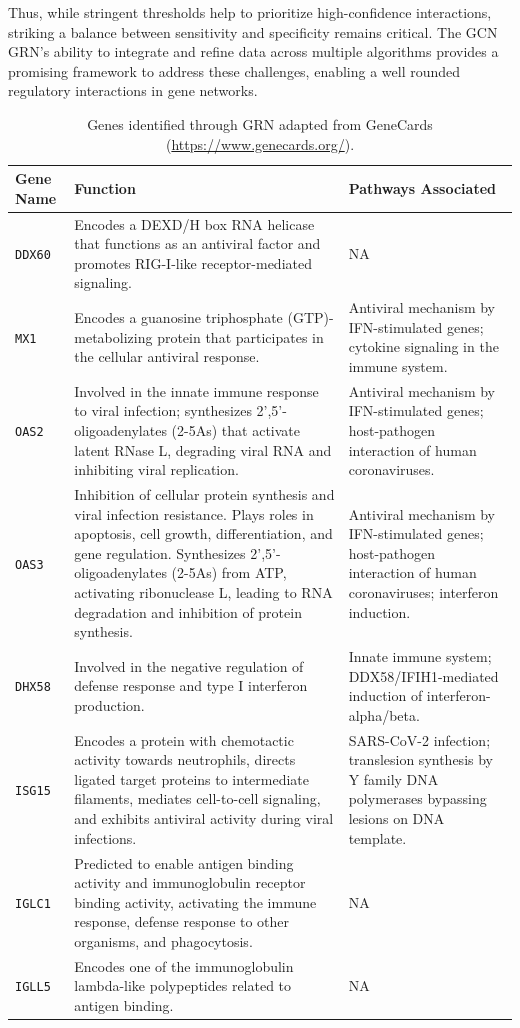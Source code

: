 \documentclass{article}
\begin{document}
Thus, while stringent thresholds help to prioritize high-confidence interactions, striking a balance between sensitivity and specificity remains critical. The GCN GRN’s ability to integrate and refine data across multiple algorithms provides a promising framework to address these challenges, enabling a well rounded regulatory interactions in gene networks.

\begin{table}[h!]
\centering
\caption{Genes identified through GRN adapted from GeneCards (\url{https://www.genecards.org/}).}
\begin{tabular}{|l|p{6cm}|p{6cm}|}
\hline
\textbf{Gene Name} & \textbf{Function} & \textbf{Pathways Associated} \\ \hline
\texttt{DDX60} & Encodes a DEXD/H box RNA helicase that functions as an antiviral factor and promotes RIG-I-like receptor-mediated signaling. & NA \\ \hline
\texttt{MX1} & Encodes a guanosine triphosphate (GTP)-metabolizing protein that participates in the cellular antiviral response. & Antiviral mechanism by IFN-stimulated genes; cytokine signaling in the immune system. \\ \hline
\texttt{OAS2} & Involved in the innate immune response to viral infection; synthesizes 2',5'-oligoadenylates (2-5As) that activate latent RNase L, degrading viral RNA and inhibiting viral replication. & Antiviral mechanism by IFN-stimulated genes; host-pathogen interaction of human coronaviruses. \\ \hline
\texttt{OAS3} & Inhibition of cellular protein synthesis and viral infection resistance. Plays roles in apoptosis, cell growth, differentiation, and gene regulation. Synthesizes 2',5'-oligoadenylates (2-5As) from ATP, activating ribonuclease L, leading to RNA degradation and inhibition of protein synthesis. & Antiviral mechanism by IFN-stimulated genes; host-pathogen interaction of human coronaviruses; interferon induction. \\ \hline
\texttt{DHX58} & Involved in the negative regulation of defense response and type I interferon production. & Innate immune system; DDX58/IFIH1-mediated induction of interferon-alpha/beta. \\ \hline
\texttt{ISG15} & Encodes a protein with chemotactic activity towards neutrophils, directs ligated target proteins to intermediate filaments, mediates cell-to-cell signaling, and exhibits antiviral activity during viral infections. & SARS-CoV-2 infection; translesion synthesis by Y family DNA polymerases bypassing lesions on DNA template. \\ \hline
\texttt{IGLC1} & Predicted to enable antigen binding activity and immunoglobulin receptor binding activity, activating the immune response, defense response to other organisms, and phagocytosis. & NA \\ \hline
\texttt{IGLL5} & Encodes one of the immunoglobulin lambda-like polypeptides related to antigen binding. & NA \\ \hline
\end{tabular}
\label{tab:grn_genes}
\end{table}
\end{document}

